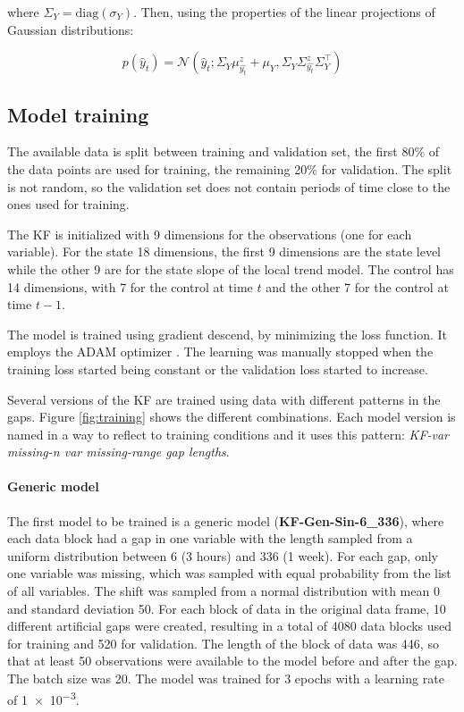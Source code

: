 \documentclass{article}
\newcommand{\norm}[3]{\mathcal{N}\left(#1; #2, #3\right)} %
\let\Oldsubsection\subsection
\renewcommand{\subsection}{\FloatBarrier\Oldsubsection}
\begin{document}
where $\Sigma_Y = \text{diag}(\sigma_Y)$. Then, using the properties of the linear projections of Gaussian distributions:

\begin{equation*}
    p(\hat{y}_t) = \norm{\hat{y}_t}{\Sigma_Y\mu^z_{\hat{y_t}} + \mu_Y}{\Sigma_Y\Sigma^z_{\hat{y_t}}\Sigma_Y^\top}
\end{equation*}

\subsection{Model training}

The available data is split between training and validation set, the first 80\% of the data points are used for training, the remaining 20\% for validation. The split is not random, so the validation set does not contain periods of time close to the ones used for training.

The KF is initialized with 9 dimensions for the observations (one for each variable). For the state 18 dimensions, the first 9 dimensions are the state level while the other 9 are for the state slope of the local trend model. The control has 14 dimensions, with 7 for the control at time $t$ and the other 7 for the control at time $t-1$.

The model is trained using gradient descend, by minimizing the loss function. It employs the ADAM optimizer \cite{kingma_adam_2017}. The learning was manually stopped when the training loss started being constant or the validation loss started to increase.

Several versions of the KF are trained using data with different patterns in the gaps. Figure \ref{fig:training} shows the different combinations. Each model version is named in a way to reflect to training conditions and it uses this pattern: \textit{KF-\textlangle var missing\textrangle-\textlangle n var missing\textrangle-\textlangle range gap lengths}.

\paragraph{Generic model} The first model to be trained is a generic model (\textbf{KF-Gen-Sin-6\_336}), where each data block had a gap in one variable with the length sampled from a uniform distribution between \num{6} (3 hours) and \num{336} (1 week). For each gap, only one variable was missing, which was sampled with equal probability from the list of all variables. The shift was sampled from a normal distribution with mean 0 and standard deviation 50. For each block of data in the original data frame, 10 different artificial gaps were created, resulting in a total of 4080 data blocks used for training and 520 for validation.
The length of the block of data was \num{446}, so that at least \num{50} observations were available to the model before and after the gap. The batch size was \num{20}.
The model was trained for \num{3} epochs with a learning rate of \num{1e-3}.
\end{document}
